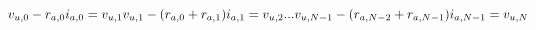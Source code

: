\documentclass[10pt]{article}
\begin{document}
\[\hspace{-15pt}v_{u,0} - r_{a,0} i_{a,0} = v_{u,1} \\
v_{u,1} - (r_{a,0} + r_{a,1}) i_{a,1} = v_{u,2}  \\
...\\
v_{u,N-1} - (r_{a,N-2} + r_{a,N-1}) i_{a,N-1} = v_{u,N} \\

\]
\end{document}
